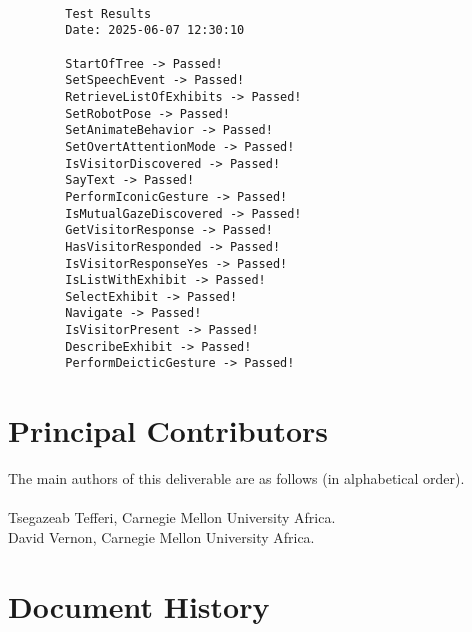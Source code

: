 \documentclass{CSSRforAfrica}
\newcommand{\blank}{~\\}
\begin{document}
\begin{lstlisting}[style=log]

        Test Results
        Date: 2025-06-07 12:30:10

        StartOfTree -> Passed!
        SetSpeechEvent -> Passed!
        RetrieveListOfExhibits -> Passed!
        SetRobotPose -> Passed!
        SetAnimateBehavior -> Passed!
        SetOvertAttentionMode -> Passed!
        IsVisitorDiscovered -> Passed!
        SayText -> Passed!
        PerformIconicGesture -> Passed!
        IsMutualGazeDiscovered -> Passed!
        GetVisitorResponse -> Passed!
        HasVisitorResponded -> Passed!
        IsVisitorResponseYes -> Passed!
        IsListWithExhibit -> Passed!
        SelectExhibit -> Passed!
        Navigate -> Passed!
        IsVisitorPresent -> Passed!
        DescribeExhibit -> Passed!
        PerformDeicticGesture -> Passed!
\end{lstlisting}

\newpage
\nocite{*}

                      


\pagebreak
\section*{Principal Contributors}
\label{contributors}
The main authors of this deliverable are as follows (in alphabetical order).
\blank
~
\blank
Tsegazeab Tefferi, Carnegie Mellon University Africa.\\    %
David Vernon, Carnegie Mellon University Africa.\\    %


\newpage
\section*{Document History}
\label{document_history}
\end{document}
